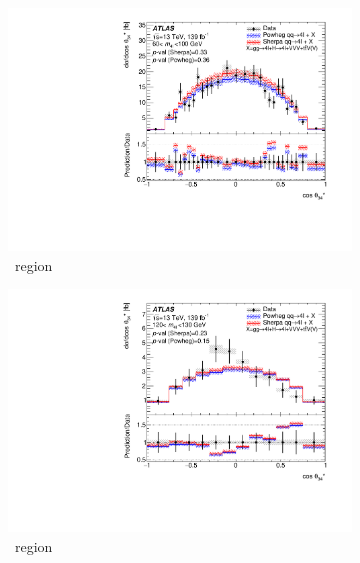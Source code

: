 \begin{figure}[H]
    \begin{subfigure}{.49\textwidth}\centering
      \includegraphics[width=.95\linewidth]{Figures/m4l/UnfoldedResults/linY_Unfolded_Data_cosThetaStar3_m4l60-100.pdf}\caption{\ZFourL \ region}\label{fig:sub-first}
    \end{subfigure}
    \begin{subfigure}{.49\textwidth}\centering
      \includegraphics[width=.95\linewidth]{Figures/m4l/UnfoldedResults/linY_Unfolded_Data_cosThetaStar3_m4l120-130.pdf} \caption{\HFourL \ region}\label{fig:sub-second}
    \end{subfigure}
    \begin{subfigure}{.49\textwidth}\centering

\end{subfigure}
\end{figure}
